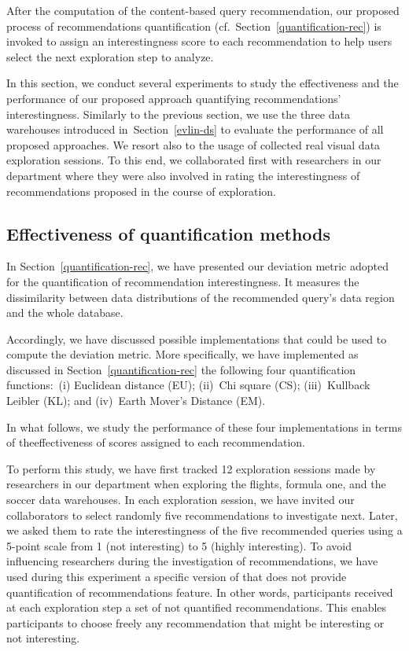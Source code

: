 \label{eval-rec:quantification}
After the computation of the content-based query recommendation, our proposed process of recommendations quantification (cf.~Section~\ref{quantification-rec}) is invoked to assign an interestingness score to each recommendation to help users select the next exploration step to analyze.


In this section, we conduct several experiments to study the effectiveness and the performance of our proposed approach quantifying recommendations' interestingness.
Similarly to the previous section, we use the three data warehouses introduced in~Section~\ref{evlin-ds} to evaluate the performance of all proposed approaches. We resort also to the usage of collected real visual data exploration sessions. To this end, we collaborated first with researchers in our department where they were also involved in rating the interestingness of recommendations proposed in the course of exploration.

\subsection{Effectiveness of quantification methods} 
\label{sec:effectivness-quant}
In Section~\ref{quantification-rec}, we have presented our deviation metric adopted for the quantification of recommendation interestingness.
It measures the dissimilarity between data distributions of the recommended query's data region and the whole database. 

Accordingly, we have discussed possible implementations that could be used to compute the deviation metric. More specifically, we have implemented as discussed in Section~\ref{quantification-rec} the following four quantification functions:~(i) Euclidean distance (EU); (ii)~Chi square (CS); (iii)~Kullback Leibler (KL); and (iv)~Earth Mover's Distance (EM). 



In what follows, we study the performance of these four implementations in terms of theeffectiveness of scores assigned to each recommendation.

To perform this study, we have first tracked 12 exploration sessions made by researchers in our department when exploring the flights, formula one, and the soccer data warehouses. 
In each exploration session, we have invited our collaborators to select randomly five recommendations to investigate next. Later, we asked them to rate the interestingness of the five recommended queries using a 5-point scale from 1 (not interesting) to 5 (highly interesting).  
To avoid influencing researchers during the investigation of recommendations, we have used during this experiment a specific version of \prototype{} that does not provide quantification of recommendations feature.
 In other words, participants received at each exploration step a set of not quantified recommendations. This enables participants to choose freely any recommendation that might be interesting or not interesting.


